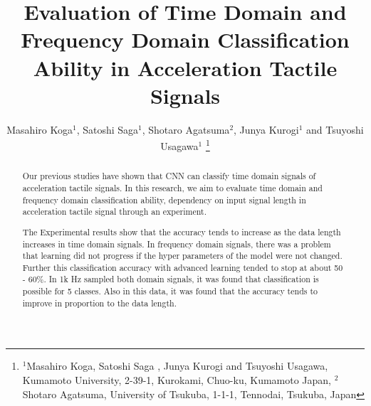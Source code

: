\documentclass[letterpaper,  10 pt,  conference]{ieeeconf}  %
\title{\LARGE \bf
Evaluation of Time Domain and Frequency Domain Classification Ability in Acceleration Tactile Signals
%
}
\author{Masahiro Koga$^{1}$,  Satoshi Saga$^{1}$,  Shotaro Agatsuma$^{2}$,  Junya Kurogi$^{1}$ and Tsuyoshi Usagawa$^{1}$ %
    \thanks{ $^{1}$Masahiro Koga, Satoshi Saga , Junya Kurogi and Tsuyoshi Usagawa,  Kumamoto University,  2-39-1,  Kurokami,  Chuo-ku,  Kumamoto Japan, 
    $^{2}$Shotaro Agatsuma,  University of Tsukuba,  1-1-1,  Tennodai,  Tsukuba,  Japan 
    }
}
\begin{document}
\maketitle
\thispagestyle{empty}
\pagestyle{empty}


\begin{abstract}
        Our previous studies have shown that CNN can classify time domain signals of acceleration tactile signals. 
        In this research,  we aim to 
        evaluate time domain and frequency domain classification ability,  dependency on input signal length in acceleration tactile signal through an experiment. 

         The Experimental results show that the accuracy tends to increase as the data length increases in time domain signals.  In frequency domain signals, there was a problem that learning did not progress if the hyper parameters of the model were not changed. 
        Further this classification accuracy with advanced learning tended to stop at about 50 - 60\%. 
        In 1k Hz sampled both domain signals,  
        it was found that classification is possible for 5 classes. 
        Also in this data,  it was found that the accuracy tends to improve in proportion to the data length. 
\end{abstract}
\end{document}
